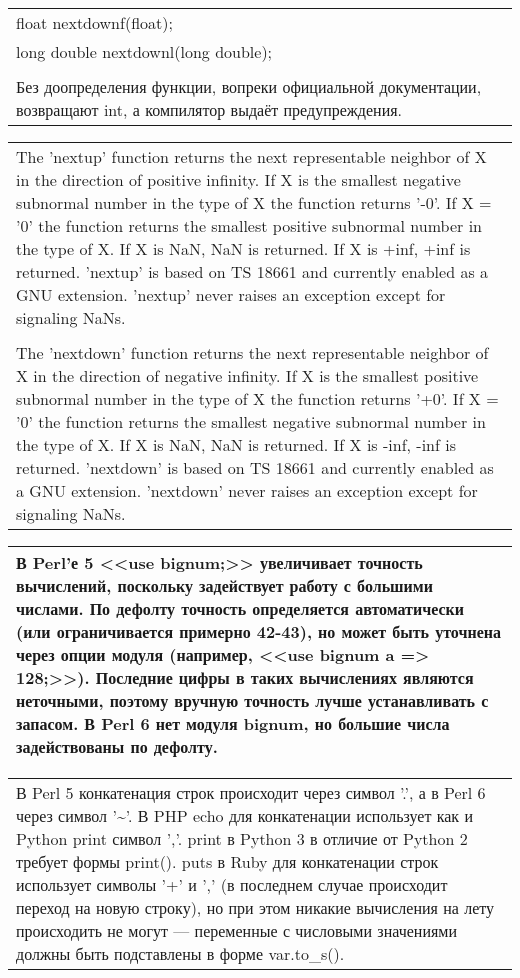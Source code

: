 \documentclass[14pt,openany]{book}
\begin{document}
\begin{center}
\begin{tabular}{|p{\textwidth}|}
float nextdownf(float); \\
long double nextdownl(long double); \\
 \\
Без доопределения функции, вопреки официальной документации, возвращают int, а компилятор выдаёт предупреждения. \\
\hline
\end{tabular}
\begin{tabular}{|p{\textwidth}|}
\hline
The 'nextup' function returns the next representable neighbor of X in the direction of positive infinity.  If X is the smallest negative subnormal number in the type of X the function returns '-0'.  If X = '0' the function returns the smallest positive subnormal number in the type of X.  If X is NaN, NaN is returned. If X is +inf, +inf is
returned.  'nextup' is based on TS 18661 and currently enabled as a GNU extension.  'nextup' never raises an exception except for signaling NaNs. \\
 \\
The 'nextdown' function returns the next representable neighbor of X in the direction of negative infinity.  If X is the smallest positive subnormal number in the type of X the function returns '+0'.  If X = '0' the function returns the smallest negative subnormal number in the type of X.  If X is NaN, NaN is returned. If X is -inf, -inf is returned.  'nextdown' is based on TS 18661 and currently enabled as a GNU extension.  'nextdown' never raises an exception except for signaling NaNs. \\
\hline
\end{tabular}
\begin{tabular}{|p{\textwidth}|}
\hline
В Perl'е 5 <<use bignum;>> увеличивает точность вычислений, поскольку задействует работу с большими числами. По дефолту точность определяется автоматически (или ограничивается примерно 42-43), но может быть уточнена через опции модуля (например, <<use bignum a => 128;>>). Последние цифры в таких вычислениях являются неточными, поэтому вручную точность лучше устанавливать с запасом. В Perl 6 нет модуля bignum, но большие числа задействованы по дефолту. \\
\hline
\end{tabular}
\begin{tabular}{|p{\textwidth}|}
\hline
В Perl 5 конкатенация строк происходит через символ '.', а в Perl 6 через символ '\textasciitilde'. В PHP echo для конкатенации использует как и Python print символ ','. print в Python 3 в отличие от Python 2 требует формы print(). puts в Ruby для конкатенации строк использует символы '+' и ',' (в последнем случае происходит переход на новую строку), но при этом никакие вычисления на лету происходить не могут --- переменные с числовыми значениями должны быть подставлены в форме var.to\_s(). \\

\end{tabular}
\end{center}
\end{document}
